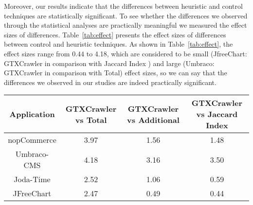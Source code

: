 Moreover, our results indicate that the differences between 
heuristic and control techniques are statistically 
significant. 
To see whether the differences we observed 
through the statistical analyses are practically 
meaningful we measured the effect 
sizes of differences. Table~\ref{tab:effect} 
presents the effect sizes of differences between 
control and heuristic techniques. 
As shown in Table~\ref{tab:effect}, 
the effect sizes range from 0.44 to 4.18, 
which are considered to be small 
(JfreeChart: GTXCrawler in comparison with Jaccard Index ) and large 
(Umbraco: GTXCrawler in comparison with Total) effect sizes, 
so we can say that the differences we 
observed in our studies are indeed practically significant.





\begin{table*}[!ht]
	\caption{Experiment Objects and Associated Data.}
	\vspace*{-10pt}
	\begin{center}
		{\scriptsize
			\begin{tabular}{|c|c|c|c|}\hline
				Application &  {GTXCrawler vs Total}  & {GTXCrawler vs Additional }  &  {GTXCrawler vs Jaccard Index} \\\hline 			
				
				nopCommerce	 & 3.97 & 1.56 & 1.48 \\
				Umbraco-CMS  & 4.18 &3.16 &	3.50 \\
				Joda-Time & 2.52 &	1.06 &	0.59 \\
				JFreeChart & 2.47 & 0.49 & 0.44 \\\hline 				
				
			\end{tabular} 
			
		}
		\end {center}
		\label{tab:effect}
		\vspace*{-5pt}
	\end{table*}












